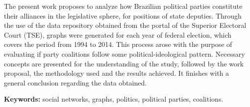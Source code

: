 The present work proposes to analyze how Brazilian political parties constitute their alliances in the legislative sphere, for positions of state deputies. Through the use of the data repository obtained from the portal of the Superior Electoral Court (TSE), graphs were generated for each year of federal election, which covers the period from 1994 to 2014. This process arose with the purpose of evaluating if party coalitions follow some political-ideological pattern. Necessary concepts are presented for the understanding of the study, followed by the work proposal, the methodology used and the results achieved. It finishes with a general conclusion regarding the data obtained.



\textbf{Keywords:} social networks, graphs, politics, political parties, coalitions.
